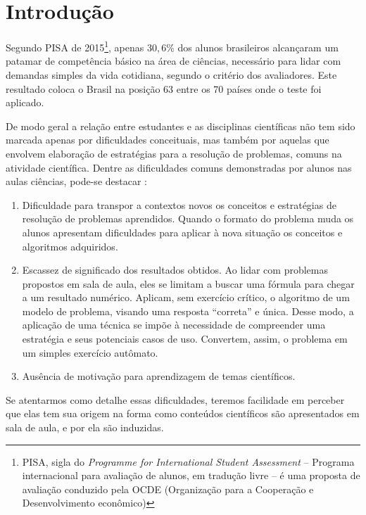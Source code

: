 \chapter*[Introdução]{Introdução}

Segundo PISA de 2015\footnote{PISA, sigla do \textit{Programme for International Student Assessment} -- Programa internacional para avaliação de alunos, em tradução livre -- é uma proposta de avaliação conduzido pela OCDE (Organização para a Cooperação e Desenvolvimento econômico)}, apenas $30,6\%$ dos alunos brasileiros alcançaram um patamar de competência básico na área de ciências, necessário para lidar com demandas simples da vida cotidiana, segundo o critério dos avaliadores. Este resultado coloca o Brasil na posição 63 entre os 70 países onde o teste foi aplicado.

De modo geral a relação entre estudantes e as disciplinas científicas não tem sido marcada apenas por dificuldades conceituais, mas também por aquelas que envolvem elaboração de estratégias para a resolução de problemas, comuns na atividade científica. Dentre as dificuldades comuns demonstradas por alunos nas aulas ciências, pode-se destacar \cite{Pozo}:


\begin{enumerate}
  \item Dificuldade para transpor a contextos novos os conceitos e estratégias de resolução de problemas aprendidos. Quando o formato do problema muda os alunos apresentam dificuldades para aplicar à nova situação os conceitos e algoritmos adquiridos. 

  \item Escassez de significado dos resultados obtidos. Ao lidar com problemas propostos em sala de aula, eles se limitam a buscar uma fórmula para chegar a um resultado numérico. Aplicam, sem exercício crítico, o algoritmo de um modelo de problema, visando uma resposta ``correta'' e única. Desse modo, a aplicação de uma técnica se impõe à necessidade de compreender uma estratégia e seus potenciais casos de uso. Convertem, assim, o problema em um simples exercício autômato. 
  
  \item Ausência de motivação para aprendizagem de temas científicos.
\end{enumerate}

Se atentarmos como detalhe essas dificuldades, teremos facilidade em perceber que elas tem sua origem na forma como conteúdos científicos são apresentados em sala de aula, e por ela são induzidas.


